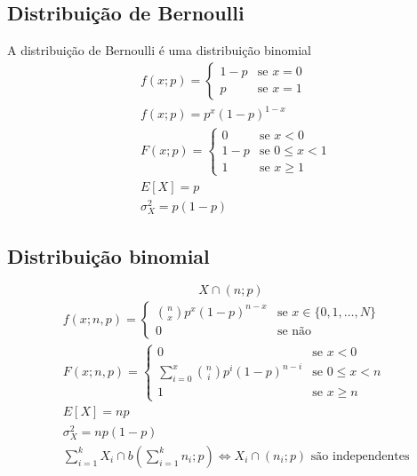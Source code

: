 \documentclass[a4paper]{article}
\begin{document}
\begin{multicols}{3}
\subsection{Distribuição de Bernoulli}
A distribuição de Bernoulli é uma distribuição binomial
\begin{align*}
  &f(x; p) = \begin{cases}
    1 - p & \text{se } x = 0 \\
    p & \text{se } x = 1
  \end{cases} \\
  &f(x; p) =  p^x (1 - p)^{1 - x} \\
  &F(x; p) = \begin{cases}
    0 & \text{se } x < 0 \\
    1-p & \text{se } 0 \leq x < 1 \\
    1 & \text{se } x \geq 1
  \end{cases} \\
  &E[X] = p \\
  &\sigma^2_X = p(1 - p)
\end{align*}
\subsection{Distribuição binomial}
$$X \cap (n; p)$$
\begin{align*}
  &f(x; n, p) = \begin{cases}
    \binom{n}{x} p^x (1 - p)^{n - x} & \text{se } x \in \{0, 1, \ldots, N\} \\
    0 & \text{se não}
  \end{cases} \\
  &F(x; n, p) = \begin{cases}
    0 & \text{se } x < 0 \\
    \sum\limits_{i=0}^x \binom{n}{i} p^i (1 - p)^{n - i} & \text{se } 0 \leq x < n \\
    1 & \text{se } x \geq n
  \end{cases} \\
  &E[X] = np \\
  &\sigma^2_X = np(1 - p) \\
  &\sum_{i=1}^k X_i \cap b\left(\sum^k_{i=1} n_i; p\right) \iff X_i \cap (n_i; p) \text{ são independentes}
\end{align*}

\end{multicols}
\end{document}
